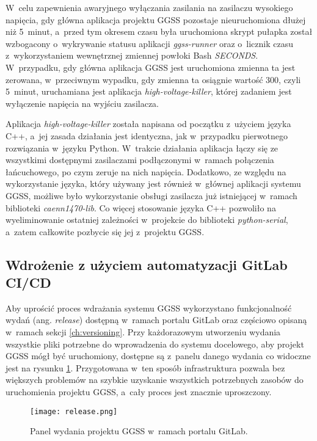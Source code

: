 W~celu zapewnienia awaryjnego wyłączania zasilania na zasilaczu wysokiego napięcia, gdy główna aplikacja projektu GGSS pozostaje nieuruchomiona dłużej niż 5~minut, a~przed tym okresem czasu była uruchomiona skrypt pułapka został wzbogacony o~wykrywanie statusu aplikacji \emph{ggss-runner} oraz o~licznik czasu z~wykorzystaniem wewnętrznej zmiennej powłoki Bash \emph{SECONDS}. W~przypadku, gdy główna aplikacja GGSS jest uruchomiona zmienna ta jest zerowana, w~przeciwnym wypadku, gdy zmienna ta osiągnie wartość 300, czyli 5~minut, uruchamiana jest aplikacja \emph{high-voltage-killer}, której zadaniem jest wyłączenie napięcia na wyjściu zasilacza.

Aplikacja \emph{high-voltage-killer} została napisana od początku z~użyciem języka C++, a~jej zasada działania jest identyczna, jak w~przypadku pierwotnego rozwiązania w~języku Python. W~trakcie działania aplikacja łączy się ze wszystkimi dostępnymi zasilaczami podłączonymi w~ramach połączenia łańcuchowego, po czym zeruje na nich napięcia. Dodatkowo, ze względu na wykorzystanie języka, który używany jest również w~głównej aplikacji systemu GGSS, możliwe było wykorzystanie obsługi zasilacza już istniejącej w~ramach biblioteki \emph{caenn1470-lib}. Co więcej stosowanie języka C++ pozwoliło na wyeliminowanie ostatniej zależności w~projekcie do biblioteki \emph{python-serial}, a~zatem całkowite pozbycie się jej z~projektu GGSS.

\subsection{Wdrożenie z użyciem automatyzacji GitLab CI/CD}
Aby uprościć proces wdrażania systemu GGSS wykorzystano funkcjonalność wydań (ang. \emph{release}) dostępną w~ramach portalu GitLab oraz częściowo opisaną w~ramach sekcji \ref{ch:versioning}. Przy każdorazowym utworzeniu wydania wszystkie pliki potrzebne do wprowadzenia do systemu docelowego, aby projekt GGSS mógł być uruchomiony, dostępne są z~panelu danego wydania co widoczne jest na rysunku \ref{fig:release}. Przygotowana w~ten sposób infrastruktura pozwala bez większych problemów na szybkie uzyskanie wszystkich potrzebnych zasobów do uruchomienia projektu GGSS, a~cały proces jest znacznie uproszczony.

\begin{figure}[H]
    \centering
    \texttt{[image: release.png]}
    \caption{Panel wydania projektu GGSS w~ramach portalu GitLab.}
    \label{fig:release}
\end{figure}


